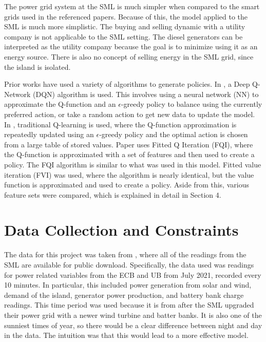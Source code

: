 \documentclass{article}
\begin{document}
The power grid system at the SML is much simpler when compared to the smart grids used in the referenced papers. Because of this, the model applied to the SML is much more simplistic. The buying and selling dynamic with a utility company is not applicable to the SML setting. The diesel generators can be interpreted as the utility company because the goal is to minimize using it as an energy source. There is also no concept of selling energy in the SML grid, since the island is isolated.

Prior works have used a variety of algorithms to generate policies. In \cite{multiagent}, a Deep Q-Network (DQN) algorithm is used. This involves using a neural network (NN) to approximate the Q-function and an ${\epsilon}$-greedy policy to balance using the currently preferred action, or take a random action to get new data to update the model. In \cite{socialwelfare}, traditional Q-learning is used, where the Q-function approximation is repeatedly updated using an ${\epsilon}$-greedy policy and the optimal action is chosen from a large table of stored values. Paper \cite{fqi} uses Fitted Q Iteration (FQI), where the Q-function is approximated with a set of features and then used to create a policy. The FQI algorithm is similar to what was used in this model. Fitted value iteration (FVI) was used, where the algorithm is nearly identical, but the value function is approximated and used to create a policy. Aside from this, various feature sets were compared, which is explained in detail in Section 4. 


\section{Data Collection and Constraints}

The data for this project was taken from \cite{smldata}, where all of the readings from the SML are available for public download. Specifically, the data used was readings for power related variables from the ECB and UB from July 2021, recorded every 10 minutes. In particular, this included power generation from solar and wind, demand of the island, generator power production, and battery bank charge readings. This time period was used because it is from after the SML upgraded their power grid with a newer wind turbine and batter banks. It is also one of the sunniest times of year, so there would be a clear difference between night and day in the data. The intuition was that this would lead to a more effective model. 
\end{document}
